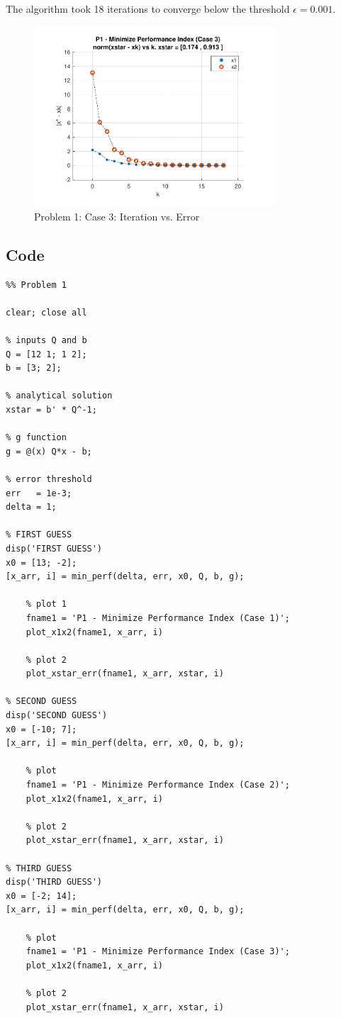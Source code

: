 \documentclass[conf]{new-aiaa}
\begin{document}
The algorithm took 18 iterations to converge below the threshold $\epsilon = 0.001$. 

\begin{figure}[H]
	\begin{center}
		\includegraphics[width=0.8\textwidth]{P1 - Minimize Performance Index (Case 3) - norm(xstar - xk) vs k. xstar = [0.174 , 0.913 ].pdf}
	\end{center}
	\caption{Problem 1: Case 3: Iteration vs. Error}
\end{figure}

\subsection{Code}

\begin{lstlisting}
%% Problem 1 

clear; close all 

% inputs Q and b 
Q = [12 1; 1 2]; 
b = [3; 2];

% analytical solution 
xstar = b' * Q^-1; 

% g function 
g = @(x) Q*x - b; 

% error threshold 
err   = 1e-3; 
delta = 1; 

% FIRST GUESS 
disp('FIRST GUESS')
x0 = [13; -2]; 
[x_arr, i] = min_perf(delta, err, x0, Q, b, g); 

	% plot 1 
	fname1 = 'P1 - Minimize Performance Index (Case 1)'; 
	plot_x1x2(fname1, x_arr, i)
	
	% plot 2 
	plot_xstar_err(fname1, x_arr, xstar, i)        

% SECOND GUESS 
disp('SECOND GUESS') 
x0 = [-10; 7]; 
[x_arr, i] = min_perf(delta, err, x0, Q, b, g); 

	% plot 
	fname1 = 'P1 - Minimize Performance Index (Case 2)'; 
	plot_x1x2(fname1, x_arr, i)
	
	% plot 2 
	plot_xstar_err(fname1, x_arr, xstar, i)

% THIRD GUESS 
disp('THIRD GUESS') 
x0 = [-2; 14]; 
[x_arr, i] = min_perf(delta, err, x0, Q, b, g); 

	% plot 
	fname1 = 'P1 - Minimize Performance Index (Case 3)'; 
	plot_x1x2(fname1, x_arr, i)
	
	% plot 2 
	plot_xstar_err(fname1, x_arr, xstar, i)
	
\end{lstlisting}
\end{document}
